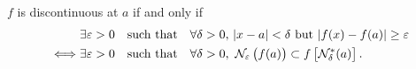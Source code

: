\documentclass[11pt,openany]{article}
\begin{document}
\begin{remark*}
	$f$ is discontinuous at $a$ if and only if \begin{align*}
		&\exists\varepsilon>0\quad\text{such that}\quad\forall\delta>0,\ \abs{x-a}<\delta\ \text{but}\ |{f(x)-f(a)}|\geq\varepsilon\\
		\iff &\exists\varepsilon>0\quad\text{such that}\quad\forall\delta>0,\ \nbhd_\varepsilon\left(f(a)\right)\subset f\left[\nbhd_\delta^*(a)\right].
	\end{align*}
\end{remark*}
\end{document}
